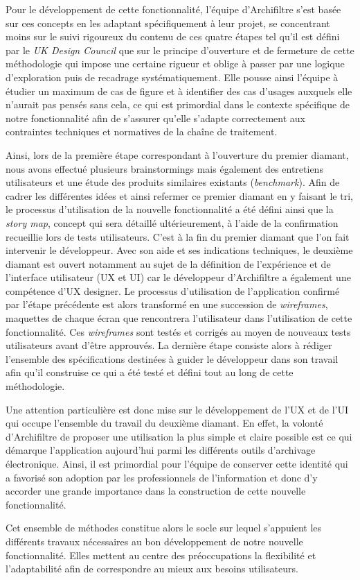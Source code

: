 Pour le développement de cette fonctionnalité, l’équipe d’\gls{Archifiltre} s’est basée sur ces concepts en les adaptant spécifiquement à leur projet, se concentrant moins sur le suivi rigoureux du contenu de ces quatre étapes tel qu’il est défini par le \textit{UK Design Council} que sur le principe d’ouverture et de fermeture de cette méthodologie qui impose une certaine rigueur et oblige à passer par une logique d’exploration puis de recadrage systématiquement. Elle pousse ainsi l’équipe à étudier un maximum de cas de figure et à identifier des cas d'usages auxquels elle n’aurait pas pensés sans cela, ce qui est primordial dans le contexte spécifique de notre fonctionnalité afin de s’assurer qu’elle s’adapte correctement aux contraintes techniques et normatives de la chaîne de traitement.


Ainsi, lors de la première étape correspondant à l’ouverture du premier diamant,  nous avons effectué plusieurs brainstormings mais également des entretiens utilisateurs et une étude des produits similaires existants (\textit{\gls{benchmark}}). Afin de cadrer les différentes idées et ainsi refermer ce premier diamant en y faisant le tri, le processus d’utilisation de la nouvelle fonctionnalité a été défini ainsi que la \textit{\gls{story map}}, concept qui sera détaillé ultérieurement, à l’aide de la confirmation recueillie lors de tests utilisateurs. C’est à la fin du premier diamant que l’on fait intervenir le développeur. Avec son aide et ses indications techniques, le deuxième diamant est ouvert notamment au sujet de la définition de l’expérience et de l'interface utilisateur (\gls{UX} et \gls{UI}) car le développeur d’\gls{Archifiltre} a également une compétence d’UX designer. Le processus d’utilisation de l’application confirmé par l’étape précédente est alors transformé en une succession de \textit{\gls{wireframe}s}, maquettes de chaque écran que rencontrera l'utilisateur dans l’utilisation de cette fonctionnalité. Ces \textit{\gls{wireframe}s} sont testés et corrigés au moyen de nouveaux tests utilisateurs avant d’être approuvés. La dernière étape consiste alors à rédiger l’ensemble des spécifications destinées à guider le développeur dans son travail afin qu’il construise ce qui a été testé et défini tout au long de cette méthodologie.

Une attention particulière est donc mise sur le développement de l’\gls{UX} et de l'\gls{UI} qui occupe l’ensemble du travail du deuxième diamant. En effet, la volonté d’\gls{Archifiltre} de proposer une utilisation la plus simple et claire possible est ce qui démarque l’application aujourd’hui parmi les différents outils d’archivage électronique. Ainsi, il est primordial pour l’équipe de conserver cette identité qui a favorisé son adoption par les professionnels de l’information et donc d’y accorder une grande importance dans la construction de cette nouvelle fonctionnalité.


Cet ensemble de méthodes constitue alors le socle sur lequel s’appuient les différents travaux nécessaires au bon développement de notre nouvelle fonctionnalité. Elles mettent au centre des préoccupations la flexibilité et l’adaptabilité afin de correspondre au mieux aux besoins utilisateurs. 